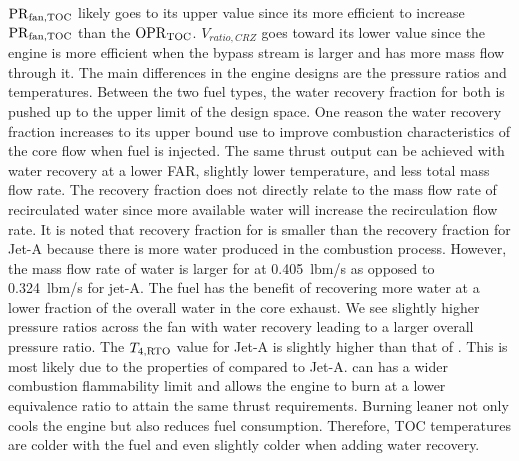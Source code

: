 \documentclass[conf]{new-aiaa}
\begin{document}
$\rm{PR}_{fan,TOC}$ likely goes to its upper value since its more efficient to increase $\rm{PR}_{fan,TOC}$ than the $\rm{OPR}_{\rm{TOC}}$.
$V_{ratio,CRZ}$ goes toward its lower value since the engine is more efficient when the bypass stream is larger and has more mass flow through it.
The main differences in the engine designs are the pressure ratios and temperatures.
Between the two fuel types, the water recovery fraction for both is pushed up to the upper limit of the design space.
One reason the water recovery fraction increases to its upper bound use to improve combustion characteristics of the core flow when fuel is injected.
The same thrust output can be achieved with water recovery at a lower FAR, slightly lower temperature, and less total mass flow rate.
The recovery fraction does not directly relate to the mass flow rate of recirculated water since more available water will increase the recirculation flow rate.
It is noted that recovery fraction for  is smaller than the recovery fraction for Jet-A because there is more water produced in the combustion process.
However, the mass flow rate of water is larger for  at \SI{0.405}{lbm/s} as opposed to \SI{0.324}{lbm/s} for jet-A.
The  fuel has the benefit of recovering more water at a lower fraction of the overall water in the core exhaust.
We see slightly higher pressure ratios across the fan with water recovery leading to a larger overall pressure ratio.
The $T_{4,\rm{RTO}}$ value for Jet-A is slightly higher than that of .
This is most likely due to the properties of  compared to Jet-A.
 can has a wider combustion flammability limit and allows the engine to burn at a lower equivalence ratio to attain the same thrust requirements.
Burning leaner not only cools the engine but also reduces fuel consumption.
Therefore, TOC temperatures are colder with the  fuel and even slightly colder when adding water recovery.
\end{document}
